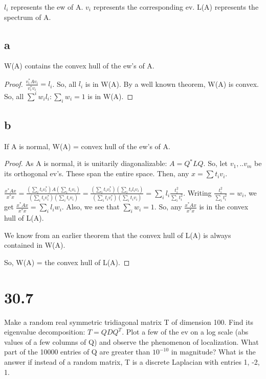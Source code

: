 \documentclass[10pt]{amsart}
\begin{document}
\begin{notation}
$l_{i}$ represents the ew of A. $v_{i}$ represents the corresponding ev. L(A) represents the spectrum of A.
\end{notation}

\subsection{a}
\begin{thm}
W(A) contains the convex hull of the ew's of A.
\end{thm}
\begin{proof}
$\frac{v_{i}^{*}Av_{i}}{v_{i}^{*}v_{i}} = l_{i}$. So, all $l_{i}$ is in W(A). By a well known theorem, W(A) is convex. So, all $\sum^{i} w_{i}l_{i} : \sum_{i}w_{i} = 1$ is in W(A).
\end{proof}

\subsection{b}
\begin{thm}
If A is normal, W(A) = convex hull of the ew's of A.
\end{thm}
\begin{proof}
As A is normal, it is unitarily diagonalizable: $A=Q^{*}LQ$. So, let $v_{1}, .. v_{m}$ be its orthogonal ev's. These span the entire space. Then, any $x = \sum t_{i}v_{i}$.

$\frac{x^{*}Ax}{x^{*}x} = \frac{(\sum_{i} t_{i}v_{i}^{*})A(\sum_{i} t_{i}v_{i})}{(\sum_{i} t_{i}v_{i}^{*})(\sum_{i} t_{i}v_{i})} = \frac{(\sum_{i} t_{i}v_{i}^{*})(\sum_{i} t_{i}l_{i}v_{i})}{(\sum_{i} t_{i}v_{i}^{*})(\sum_{i} t_{i}v_{i})} = \sum_{i} l_{i}\frac{t_{i}^{2}}{\sum_{i} t_{i}^{2}}$. Writing $\frac{t_{i}^{2}}{\sum_{i} t_{i}^{2}} = w_{i}$, we get $\frac{x^{*}Ax}{x^{*}x} = \sum_{i} l_{i}w_{i}$. Also, we see that $\sum_{i}w_{i} = 1$. So, any $\frac{x^{*}Ax}{x^{*}x}$ is in the convex hull of L(A).

We know from an earlier theorem that the convex hull of L(A) is always contained in W(A).

So, W(A) = the convex hull of L(A).
\end{proof}

\section{30.7}
Make a random real symmetric tridiagonal matrix T of dimension 100.
Find its eigenvalue decomposition: $T=QDQ^{T}$. Plot a few of the ev on a log scale (abs values of a few columns of Q) and observe the phenomenon of localization. What part of the 10000 entries of Q are greater than $10^{-10}$ in magnitude? What is the answer if instead of a random matrix, T is a discrete Laplacian with entries 1, -2, 1.
\end{document}

